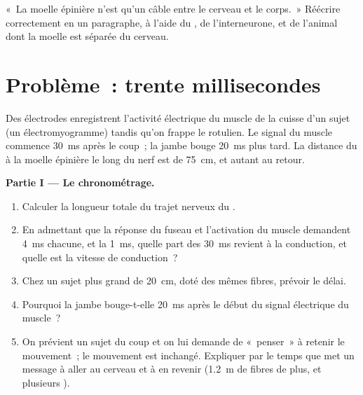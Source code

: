 \begin{exercise}[$\star\star\star$]\label{exo:g12:stretch-reflex:15}
«~La moelle épinière n'est qu'un câble entre le cerveau et le corps.~»
Réécrire correctement en un paragraphe, à l'aide du , de
l'interneurone, et de l'animal dont la moelle est séparée du cerveau.
\end{exercise}

\section{Problème~: trente millisecondes}

\begin{problem}
\label{pb:g12:stretch-reflex:1}
Des électrodes enregistrent l'activité électrique du muscle de la
cuisse d'un sujet (un électromyogramme) tandis qu'on frappe le 
rotulien. Le signal du muscle commence \qty{30}{ms} après le coup~; la
jambe bouge \qty{20}{ms} plus tard. La distance du  à la moelle
épinière le long du nerf est de \qty{75}{cm}, et autant au retour.

\medskip
\noindent\textbf{Partie I --- Le chronométrage.}
\begin{enumerate}
  \item Calculer la longueur totale du trajet nerveux du .
  \item En admettant que la réponse du fuseau et l'activation du
        muscle demandent \qty{4}{ms} chacune, et la 
        \qty{1}{ms}, quelle part des \qty{30}{ms} revient à la
        conduction, et quelle est la vitesse de conduction~?
  \item Chez un sujet plus grand de \qty{20}{cm}, doté des mêmes
        fibres, prévoir le délai.
  \item Pourquoi la jambe bouge-t-elle \qty{20}{ms} après le début du
        signal électrique du muscle~?
  \item On prévient un sujet du coup et on lui demande de «~penser~» à
        retenir le mouvement~; le mouvement est inchangé. Expliquer
        par le temps que met un message à aller au cerveau et à en
        revenir (\qty{1.2}{m} de fibres de plus, et plusieurs
        ).
\end{enumerate}


\end{problem}
